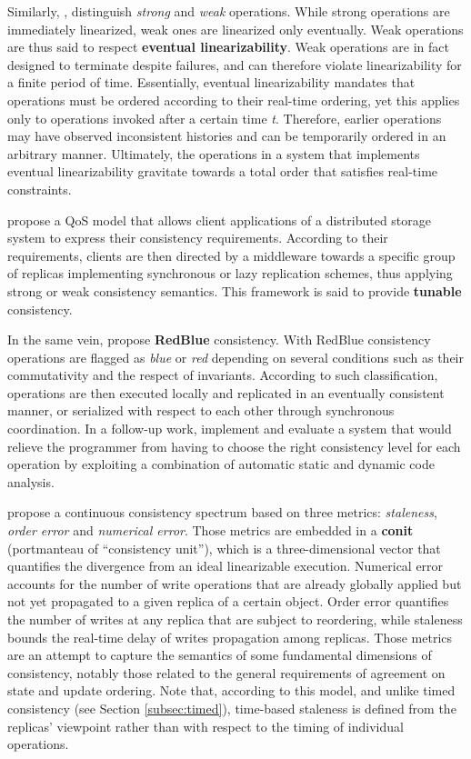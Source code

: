 \documentclass[letter, 11pt]{article}
\newcommand{\citeN}{\citet}
\begin{document}
Similarly, \citeN{Serafini.Dobre.ea:10}, distinguish \emph{strong} and \emph{weak} operations.
While strong operations are immediately linearized, weak ones are linearized only eventually.
Weak operations are thus said to respect \textbf{eventual linearizability}.
Weak operations are in fact designed to terminate despite failures,
and can therefore violate linearizability for a finite period of time.
Essentially, eventual linearizability mandates that operations must be ordered 
according to their real-time ordering, yet this applies only to operations invoked after a certain time \emph{t}.
Therefore, earlier operations may have observed inconsistent histories 
and can be temporarily ordered in an arbitrary manner.
Ultimately, the operations in a system that implements eventual linearizability gravitate towards a 
total order that satisfies real-time constraints.

\citeN{Krishnamurthy.Sanders.ea:02}
propose a QoS model that allows client applications of a distributed storage system
to express their consistency requirements. 
According to their requirements, clients are then directed by a middleware towards a 
specific group of replicas implementing synchronous or lazy replication schemes, 
thus applying strong or weak consistency semantics.
This framework is said to provide \textbf{tunable} consistency.

In the same vein, \citeN{Li.Porto.ea:12} propose \textbf{RedBlue} consistency. 
With RedBlue consistency operations are flagged as \emph{blue} or \emph{red}
depending on several conditions such as their commutativity and the respect of invariants.
According to such classification, operations are then 
executed locally and replicated in an eventually consistent manner, 
or serialized with respect to each other through synchronous coordination.
In a follow-up work, \citeN{Li.ea:14} implement and evaluate a system that
would relieve the programmer
from having to choose the right consistency level for each operation
by exploiting a combination of automatic static and dynamic code analysis.

\citeN{Yu.Vahdat:02} propose a continuous consistency spectrum 
based on three metrics: \emph{staleness}, \emph{order error} and \emph{numerical error}.
Those metrics are embedded in a \textbf{conit} (portmanteau of ``consistency unit''), 
which is a three-dimensional vector that quantifies the divergence from an ideal linearizable execution.
Numerical error accounts for the number of write operations that are already 
globally applied but not yet propagated to a given replica of a certain object.
Order error quantifies the number of writes 
at any replica that are subject to reordering, 
while staleness bounds the real-time delay of writes propagation among replicas.
Those metrics are an attempt to capture the semantics of some fundamental dimensions of consistency, 
notably those related to the general requirements of agreement on state and update ordering.
Note that, according to this model, and unlike timed consistency (see Section \ref{subsec:timed}), 
time-based staleness is defined from the replicas' viewpoint rather than 
with respect to the timing of individual operations.
\end{document}
